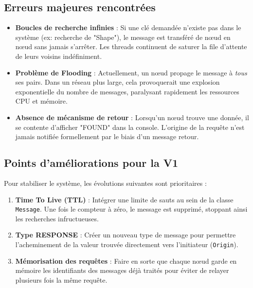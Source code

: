 \subsection{Erreurs majeures rencontr\'ees}
\begin{itemize}
    \item \textbf{Boucles de recherche infinies} : Si une cl\'e demand\'ee n'existe pas dans le syst\`eme (ex: recherche de "Shape"), le message est transf\'er\'e de n\oe ud en n\oe ud sans jamais s'arr\^eter. Les threads continuent de saturer la file d'attente de leurs voisins ind\'efiniment.
    \item \textbf{Probl\`eme de Flooding} : Actuellement, un n\oe ud propage le message \`a \textit{tous} ses pairs. Dans un r\'eseau plus large, cela provoquerait une explosion exponentielle du nombre de messages, paralysant rapidement les ressources CPU et m\'emoire.
    \item \textbf{Absence de m\'ecanisme de retour} : Lorsqu'un n\oe ud trouve une donn\'ee, il se contente d'afficher "FOUND" dans la console. L'origine de la requ\^ete n'est jamais notifi\'ee formellement par le biais d'un message retour.
\end{itemize}

\subsection{Points d'am\'eliorations pour la V1}
Pour stabiliser le syst\`eme, les \'evolutions suivantes sont prioritaires :
\begin{enumerate}
    \item \textbf{Time To Live (TTL)} : Int\'egrer une limite de sauts au sein de la classe \texttt{Message}. Une fois le compteur \`a z\'ero, le message est supprim\'e, stoppant ainsi les recherches infructueuses.
    \item \textbf{Type RESPONSE} : Cr\'eer un nouveau type de message pour permettre l'acheminement de la valeur trouv\'ee directement vers l'initiateur (\texttt{Origin}).
    \item \textbf{M\'emorisation des requ\^etes} : Faire en sorte que chaque n\oe ud garde en m\'emoire les identifiants des messages d\'ej\`a trait\'es pour \'eviter de relayer plusieurs fois la m\^eme requ\^ete.
\end{enumerate}
